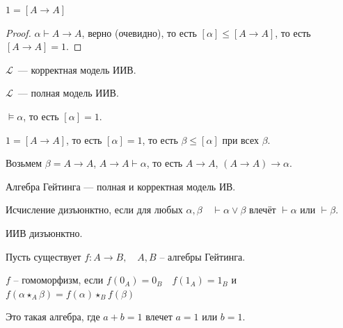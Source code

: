 \begin{lemma}
    $1 = [A \to A]$
\end{lemma}

\begin{proof}
    $\alpha \vdash A \to A$, верно (очевидно), то есть $[\alpha] \leqslant [A \to A]$, то есть $[A \to A] = 1$.
\end{proof}

\begin{theorem}
    $\mathcal{L}$~--- корректная модель ИИВ.
\end{theorem}

\begin{theorem}
    $\mathcal{L}$~--- полная модель ИИВ.

\end{theorem}

\begin{theorem}
    $\vDash \alpha$, то есть $[\alpha] = 1$.

    $1 = [A \to A]$, то есть $[\alpha] =1$, то есть $\beta \leqslant [\alpha]$ при всех $\beta$.
    
    Возьмем $\beta = A \to A$, $A \to A \vdash \alpha$, то есть $A \to A$, $(A \to A) \to \alpha$.

\end{theorem}

\begin{theorem}
    Алгебра Гейтинга --- полная и корректная модель ИВ.
\end{theorem}

\begin{definition}
    Исчисление дизъюнктно, если для любых $\alpha, \beta\quad \vdash \alpha \lor \beta$ влечёт $\vdash \alpha$ или $\vdash \beta$.
\end{definition}

\begin{theorem}
    ИИВ дизъюнктно.
\end{theorem}

\begin{definition}
    Пусть существует $f: A \to B, \quad A, B$ -- алгебры Гейтинга.    

    $f$ -- гомоморфизм, если $f(0_A) = 0_B\quad f(1_A) = 1_B$ и $f(\alpha \star_A \beta) = f(\alpha) \star_B f(\beta)$
\end{definition}

\begin{definition}   
    Это такая алгебра, где $a + b = 1$ влечет $a = 1$ или $b = 1$.
\end{definition}

